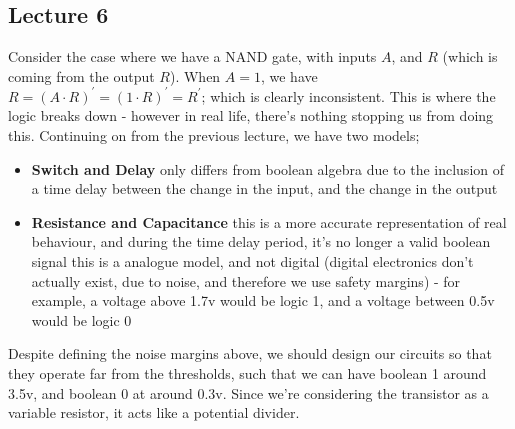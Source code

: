 \documentclass[a4paper, 12pt]{article}
\begin{document}
        \subsection*{Lecture 6}
            Consider the case where we have a NAND gate, with inputs $A$, and $R$ (which is coming from the output $R$). When $A = 1$, we have $R = (A \cdot R)^\prime = (1 \cdot R)^\prime = R^\prime$; which is clearly inconsistent. This is where the logic breaks down - however in real life, there's nothing stopping us from doing this. Continuing on from the previous lecture, we have two models;
            \begin{itemize}
                \itemsep0em
                \item \textbf{Switch and Delay}
                    \subitem only differs from boolean algebra due to the inclusion of a time delay between the change in the input, and the change in the output
                \item \textbf{Resistance and Capacitance}
                    \subitem this is a more accurate representation of real behaviour, and during the time delay period, it's no longer a valid boolean signal
                    \subitem this is a analogue model, and not digital (digital electronics don't actually exist, due to noise, and therefore we use safety margins) - for example, a voltage above 1.7v would be logic 1, and a voltage between 0.5v would be logic 0
            \end{itemize}
            Despite defining the noise margins above, we should design our circuits so that they operate far from the thresholds, such that we can have boolean 1 around 3.5v, and boolean 0 at around 0.3v. Since we're considering the transistor as a variable resistor, it acts like a potential divider.
            \medskip
\end{document}
